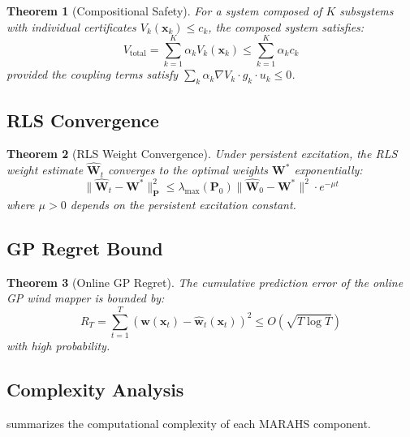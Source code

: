\documentclass[12pt,a4paper,twocolumn]{article}
\newcommand{\vect}[1]{\mathbf{#1}}
\newcommand{\mat}[1]{\mathbf{#1}}
\newtheorem{theorem}{Theorem}[section]
\begin{document}
\begin{theorem}[Compositional Safety]
\label{thm:compositional}
For a system composed of $K$ subsystems with individual certificates $V_k(\vect{x}_k) \leq c_k$, the composed system satisfies:
\begin{equation}
    V_{\text{total}} = \sum_{k=1}^K \alpha_k V_k(\vect{x}_k) \leq \sum_{k=1}^K \alpha_k c_k
\end{equation}
provided the coupling terms satisfy $\sum_k \alpha_k \nabla V_k \cdot g_k \cdot u_k \leq 0$.
\end{theorem}

\subsection{RLS Convergence}

\begin{theorem}[RLS Weight Convergence]
\label{thm:rls}
Under persistent excitation, the RLS weight estimate $\hat{\mat{W}}_t$ converges to the optimal weights $\mat{W}^*$ exponentially:
\begin{equation}
    \|\hat{\mat{W}}_t - \mat{W}^*\|_{\mat{P}}^2 \leq \lambda_{\max}(\mat{P}_0)\|\hat{\mat{W}}_0 - \mat{W}^*\|^2 \cdot e^{-\mu t}
\end{equation}
where $\mu > 0$ depends on the persistent excitation constant.
\end{theorem}

\subsection{GP Regret Bound}

\begin{theorem}[Online GP Regret]
\label{thm:gp_regret}
The cumulative prediction error of the online GP wind mapper is bounded by:
\begin{equation}
    R_T = \sum_{t=1}^T (\vect{w}(\vect{x}_t) - \hat{\vect{w}}_t(\vect{x}_t))^2 \leq O(\sqrt{T \log T})
\end{equation}
with high probability.
\end{theorem}

\subsection{Complexity Analysis}
\label{sec:complexity}

 summarizes the computational complexity of each MARAHS component.
\end{document}
